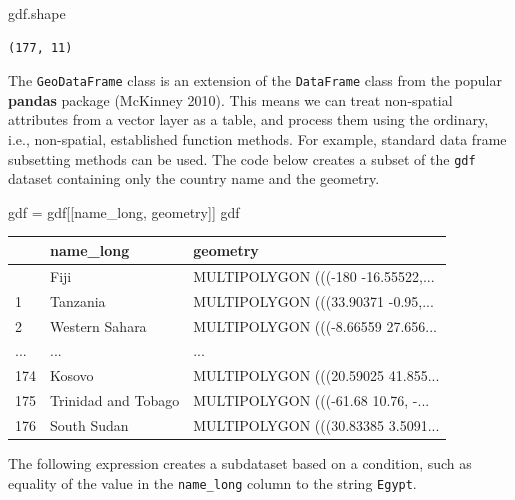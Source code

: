 \documentclass[
  letterpaper,
]{krantz}
\newenvironment{Shaded}{\begin{snugshade}}{\end{snugshade}}
\newcommand{\NormalTok}[1]{\textcolor[rgb]{0.00,0.23,0.31}{#1}}
\newcommand{\OperatorTok}[1]{\textcolor[rgb]{0.37,0.37,0.37}{#1}}
\newcommand{\StringTok}[1]{\textcolor[rgb]{0.13,0.47,0.30}{#1}}
\begin{document}
\begin{Shaded}
\begin{Highlighting}[]
\NormalTok{gdf.shape}
\end{Highlighting}
\end{Shaded}

\begin{verbatim}
(177, 11)
\end{verbatim}

The \texttt{GeoDataFrame} class is an extension of the
\texttt{DataFrame} class from the popular \textbf{pandas} package
(McKinney 2010). This means we can treat non-spatial attributes from a
vector layer as a table, and process them using the ordinary, i.e.,
non-spatial, established function methods. For example, standard data
frame subsetting methods can be used. The code below creates a subset of
the \texttt{gdf} dataset containing only the country name and the
geometry.

\begin{Shaded}
\begin{Highlighting}[]
\NormalTok{gdf }\OperatorTok{=}\NormalTok{ gdf[[}\StringTok{\textquotesingle{}name\_long\textquotesingle{}}\NormalTok{, }\StringTok{\textquotesingle{}geometry\textquotesingle{}}\NormalTok{]]}
\NormalTok{gdf}
\end{Highlighting}
\end{Shaded}

\begin{longtable}[]{@{}lll@{}}
\toprule\noalign{}
& name\_long & geometry \\
\midrule\noalign{}
\endhead
\bottomrule\noalign{}
\endlastfoot
0 & Fiji & MULTIPOLYGON (((-180 -16.55522,... \\
1 & Tanzania & MULTIPOLYGON (((33.90371 -0.95,... \\
2 & Western Sahara & MULTIPOLYGON (((-8.66559 27.656... \\
... & ... & ... \\
174 & Kosovo & MULTIPOLYGON (((20.59025 41.855... \\
175 & Trinidad and Tobago & MULTIPOLYGON (((-61.68 10.76, -... \\
176 & South Sudan & MULTIPOLYGON (((30.83385 3.5091... \\
\end{longtable}

The following expression creates a subdataset based on a condition, such
as equality of the value in the
\texttt{\textquotesingle{}name\_long\textquotesingle{}} column to the
string \texttt{\textquotesingle{}Egypt\textquotesingle{}}.
\end{document}
